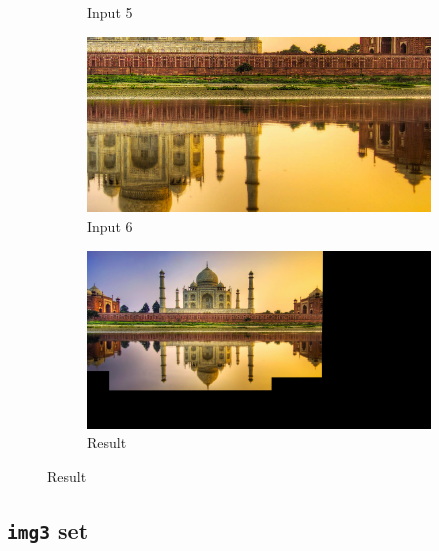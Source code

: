 \documentclass[a4paper,11]{article}
\begin{document}
\begin{figure}
\begin{subfigure}{0.5\textwidth}
	\caption{Input 5}
      \end{subfigure}
      \begin{subfigure}{0.5\textwidth}
	\centering
	\includegraphics[width=.8\linewidth]{img2_6}
	\caption{Input 6}
      \end{subfigure}
      \begin{subfigure}{\textwidth}
	\centering
	\includegraphics[width=.8\linewidth]{mosaic2}
	\caption{Result}
      \end{subfigure}
    \end{figure}
  
  \subsection{\texttt{img3} set}
  
\end{document}
